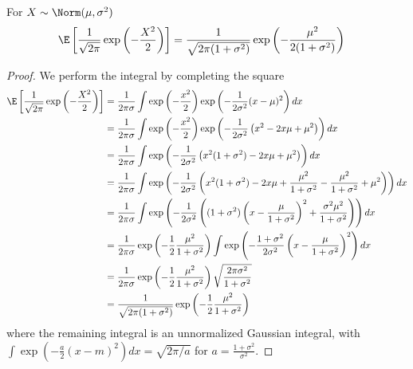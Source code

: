 \documentclass[12pt]{article}
\begin{document}
\begin{lemma}\label{lemma:exponent}
    For $X \sim \Norm(\mu, \sigma^2)$
    \begin{align}
        \E\left[\frac{1}{\sqrt{2\pi}}\exp\left(-\frac{X^2}{2}\right)\right] &= 
            \frac{1}{\sqrt{2\pi(1+\sigma^2)}}\exp\left(-\frac{\mu^2}{2(1+\sigma^2)}\right)
    \end{align}
\end{lemma}
\begin{proof}
    We perform the integral by completing the square
    \begin{align}
        \E\left[\frac{1}{\sqrt{2\pi}}\exp\left(-\frac{X^2}{2}\right)\right] &= 
                \frac{1}{2\pi\sigma}\int \exp\left(-\frac{x^2}{2}\right)\exp\left(-\frac {1}{2\sigma^2}(x-\mu)^2\right) dx \\
        &= \frac{1}{2\pi\sigma}\int \exp\left(-\frac{x^2}{2}\right)\exp\left(-\frac{1}{2\sigma^2} \left(x^2 - 2x\mu + \mu^2 \right)\right) dx \\
        &= \frac{1}{2\pi\sigma}\int \exp\left(-\frac{1}{2\sigma^2}\left(x^2(1+\sigma^2) - 2x\mu + \mu^2 \right)\right) dx \\
        &= \frac{1}{2\pi\sigma}\int \exp\left(-\frac{1}{2\sigma^2}\left(x^2(1+\sigma^2) - 2x\mu + \frac{\mu^2}{1+\sigma^2} -  \frac{\mu^2}{1+\sigma^2} + \mu^2 \right)\right) dx\\
        &= \frac{1}{2\pi\sigma}\int \exp\left(-\frac{1}{2\sigma^2}\left((1+\sigma^2)\left(x - \frac{\mu}{1+\sigma^2}\right)^2 + \frac{\sigma^2\mu^2}{1+\sigma^2} \right)\right) dx\\
        &= \frac{1}{2\pi\sigma}\exp\left(-\frac 1 2\frac{\mu^2}{1+\sigma^2}\right)\int \exp\left(-\frac {1+\sigma^2}{2\sigma^2}\left(x - \frac{\mu}{1+\sigma^2}\right)^2\right) dx \\
        &= \frac{1}{2\pi\sigma}\exp\left(-\frac 1 2\frac{\mu^2}{1+\sigma^2}\right)\sqrt{\frac{2\pi\sigma^2}{1+\sigma^2}} \\
        &= \frac{1}{\sqrt{2\pi(1+\sigma^2)}}\exp\left(-\frac 1 2\frac{\mu^2}{1+\sigma^2}\right)
    \end{align}
    where the remaining integral is an unnormalized Gaussian integral, with $\int \exp\left(-\frac{a}{2}(x-m)^2\right)dx = \sqrt{2\pi/a}$ for $a = \frac{1+\sigma^2}{\sigma^2}$.
\end{proof}
\end{document}
